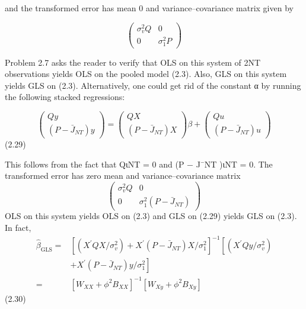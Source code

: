 \documentclass[
]{book}
\begin{document}
and the transformed error has mean 0 and variance--covariance matrix given by

\[
\left(\begin{array}{cc}
\sigma_{v}^{2} Q & 0 \\
0 & \sigma_{1}^{2} P
\end{array}\right)
\]

Problem 2.7 asks the reader to verify that OLS on this system of 2NT observations yields OLS on the pooled model (2.3). Also, GLS on this system yields GLS on (2.3). Alternatively, one could get rid of the constant α by running the following stacked regressions:

\begin{equation}
\left(\begin{array}{c}
Q y \\
\left(P-\bar{J}_{N T}\right) y
\end{array}\right)=\left(\begin{array}{c}
Q X \\
\left(P-\bar{J}_{N T}\right) X
\end{array}\right) \beta+\left(\begin{array}{c}
Q u \\
\left(P-\bar{J}_{N T}\right) u
\end{array}\right)
\end{equation} (2.29)

This follows from the fact that QιNT = 0 and (P − J¯NT )ιNT = 0. The transformed error has zero mean and variance--covariance matrix \[
\left(\begin{array}{cc}
\sigma_{v}^{2} Q & 0 \\
0 & \sigma_{1}^{2}\left(P-\bar{J}_{N T}\right)
\end{array}\right)
\] OLS on this system yields OLS on (2.3) and GLS on (2.29) yields GLS on (2.3). In fact, \begin{equation}
\begin{aligned}
\widehat{\beta}_{\mathrm{GLS}}=&\left[\left(X^{\prime} Q X / \sigma_{v}^{2}\right)+X^{\prime}\left(P-\bar{J}_{N T}\right) X / \sigma_{1}^{2}\right]^{-1}\left[\left(X^{\prime} Q y / \sigma_{v}^{2}\right)\right.\\
&\left.+X^{\prime}\left(P-\bar{J}_{N T}\right) y / \sigma_{1}^{2}\right] \\
=&\left[W_{X X}+\phi^{2} B_{X X}\right]^{-1}\left[W_{X y}+\phi^{2} B_{X y}\right]
\end{aligned}
\end{equation} (2.30)
\end{document}
